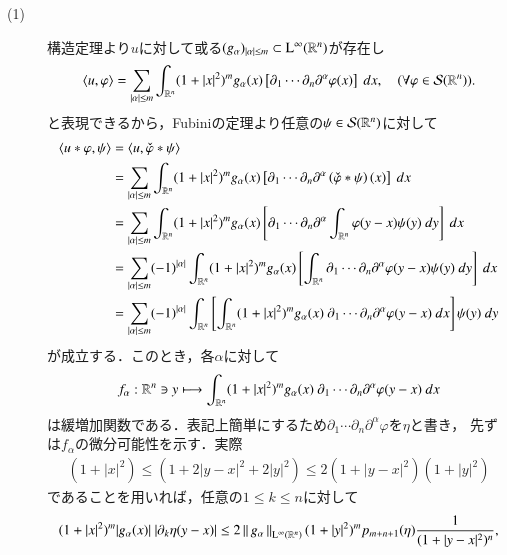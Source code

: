 	\begin{prf}\mbox{}
		\begin{description}
			\item[(1)] 構造定理より$u$に対して或る$(g_\alpha)_{|\alpha| \leq m} \subset \mathrm{L}^\infty(\mathbb{R}^n)$が存在し
			\begin{align}
				\inprod<u,\varphi> =
				\sum_{|\alpha| \leq m} \int_{\R^n} (1+|x|^2)^m g_\alpha(x) \left[ \partial_1 \cdots \partial_n \partial^\alpha \varphi(x) \right]\ dx,
				\quad (\forall \varphi \in \rapid{\R^n}).
			\end{align}
			と表現できるから，Fubiniの定理より任意の$\psi \in \mathcal{S}(\mathbb{R}^n)$に対して
			\begin{align}
				\inprod<u \ast \varphi,\psi> &= \inprod<u, \check{\varphi} \ast \psi> \\
				&= \sum_{|\alpha| \leq m} \int_{\R^n} (1+|x|^2)^m g_\alpha(x) \left[ \partial_1 \cdots \partial_n \partial^\alpha \left(\check{\varphi} \ast \psi\right)(x) \right]\ dx \\
				&= \sum_{|\alpha| \leq m} \int_{\R^n} (1+|x|^2)^m g_\alpha(x) \left[ \partial_1 \cdots \partial_n \partial^\alpha \int_{\R^n} \varphi(y-x) \psi (y)\ dy \right]\ dx \\
				&= \sum_{|\alpha| \leq m} (-1)^{|\alpha|} \int_{\R^n} (1+|x|^2)^m g_\alpha(x) \left[ \int_{\R^n} \partial_1 \cdots \partial_n \partial^\alpha\varphi(y-x) \psi (y)\ dy \right]\ dx \\
				&= \sum_{|\alpha| \leq m} (-1)^{|\alpha|} \int_{\R^n} \left[ \int_{\R^n} (1+|x|^2)^m g_\alpha(x)\ \partial_1 \cdots \partial_n \partial^\alpha\varphi(y-x)\ dx\right] \psi(y)\ dy
			\end{align}
			が成立する．このとき，各$\alpha$に対して
			\begin{align}
				f_\alpha:\R^n \ni y \longmapsto \int_{\R^n} (1+|x|^2)^m g_\alpha(x)\ \partial_1 \cdots \partial_n \partial^\alpha\varphi(y-x)\ dx
			\end{align}
			は緩増加関数である．表記上簡単にするため$\partial_1 \cdots \partial_n \partial^\alpha\varphi$を$\eta$と書き，
			先ずは$f_\alpha$の微分可能性を示す．実際
			\begin{align}
				(1+|x|^2) \leq (1 + 2|y-x|^2 + 2|y|^2) \leq 2(1+|y-x|^2)(1+|y|^2)
			\end{align}
			であることを用いれば，任意の$1 \leq k \leq n$に対して
			\begin{align}
				(1+|x|^2)^m |g_\alpha(x)|\ |\partial_k \eta(y-x)|
				\leq 2 \Norm{g_\alpha}{\mathrm{L}^\infty(\R^n)} (1+|y|^2)^m p_{m+n+1}(\eta) \frac{1}{(1+|y-x|^2)^n},

\end{align}
\end{description}
\end{prf}
